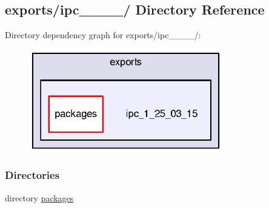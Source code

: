 \subsection{exports/ipc\-\_\-\_\-\_\-\_/ Directory Reference}
\label{dir_010092f914561f4ed3899313fd63b3c7}
Directory dependency graph for exports/ipc\-\_\-\_\-\_\-\_/\-:
\nopagebreak
\begin{figure}[H]
\begin{center}
\leavevmode
\includegraphics[width=239pt]{dir_010092f914561f4ed3899313fd63b3c7_dep}
\end{center}
\end{figure}
\subsubsection*{Directories}
\begin{DoxyCompactItemize}
\item 
directory \hyperlink{dir_f569b9b8dc21cdacb33a464cdae970fd}{packages}
\end{DoxyCompactItemize}
